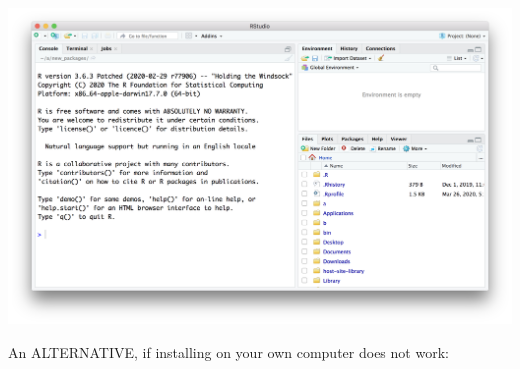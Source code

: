 \documentclass[
]{book}
\begin{document}
\includegraphics{images/RStudio-screenshot.png}

An ALTERNATIVE, if installing on your own computer does not work:
\end{document}

